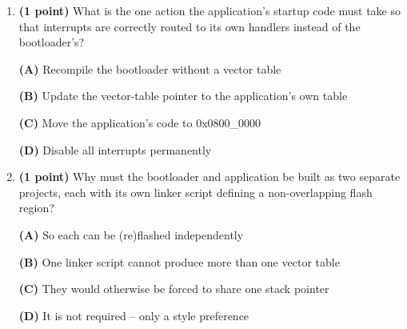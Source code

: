 \documentclass[20pt]{extarticle}
\begin{document}
\begin{enumerate}[label=\textbf{\arabic*.}, leftmargin=*, itemsep=2pt]
\newpage

\begin{enumerate}[resume, label=(\alph*), leftmargin=*, itemsep=6pt]
\item \textbf{(1 point)} What is the one action the application's startup code must take so that interrupts are correctly routed to its own handlers instead of the bootloader's?

\begin{center}
\textbf{(A)} Recompile the bootloader without a vector table

\textbf{(B)} Update the vector-table pointer to the application's own table

\textbf{(C)} Move the application's code to 0x0800\_0000

\textbf{(D)} Disable all interrupts permanently
\end{center}

\item \textbf{(1 point)} Why must the bootloader and application be built as two separate projects, each with its own linker script defining a non-overlapping flash region?

\begin{center}
\textbf{(A)} So each can be (re)flashed independently

\textbf{(B)} One linker script cannot produce more than one vector table

\textbf{(C)} They would otherwise be forced to share one stack pointer

\textbf{(D)} It is not required -- only a style preference
\end{center}
\end{enumerate}

\end{enumerate}
\end{document}
